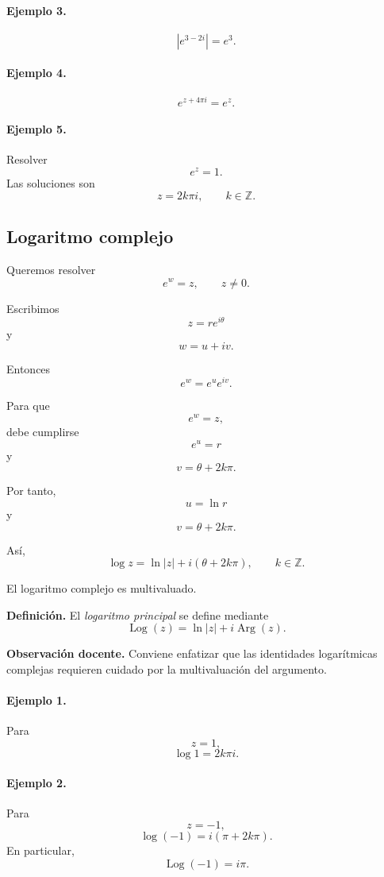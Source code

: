 \paragraph{Ejemplo 3.}
\[
|e^{3-2i}|=e^3.
\]

\paragraph{Ejemplo 4.}
\[
e^{z+4\pi i}=e^z.
\]

\paragraph{Ejemplo 5.}
Resolver
\[
e^z=1.
\]
Las soluciones son
\[
\boxed{z=2k\pi i,\qquad k\in\mathbb{Z}.}
\]

\subsection{Logaritmo complejo}

Queremos resolver
\[
e^w=z,
\qquad
z\neq0.
\]

Escribimos
\[
z=re^{i\theta}
\]
y
\[
w=u+iv.
\]

Entonces
\[
e^w
=
e^u e^{iv}.
\]

Para que
\[
e^w=z,
\]
debe cumplirse
\[
e^u=r
\]
y
\[
v=\theta+2k\pi.
\]

Por tanto,
\[
u=\ln r
\]
y
\[
v=\theta+2k\pi.
\]

Así,
\[
\boxed{
\log z
=
\ln|z|
+
i(\theta+2k\pi),
\qquad
k\in\mathbb{Z}.
}
\]

El logaritmo complejo es multivaluado.

\textbf{Definición.}
El \emph{logaritmo principal} se define mediante
\[
\boxed{
\operatorname{Log}(z)
=
\ln|z|
+
i\operatorname{Arg}(z).
}
\]

\textbf{Observación docente.}
Conviene enfatizar que las identidades logarítmicas complejas requieren
cuidado por la multivaluación del argumento.

\paragraph{Ejemplo 1.}
Para
\[
z=1,
\]
\[
\log 1
=
2k\pi i.
\]

\paragraph{Ejemplo 2.}
Para
\[
z=-1,
\]
\[
\log(-1)
=
i(\pi+2k\pi).
\]
En particular,
\[
\operatorname{Log}(-1)=i\pi.
\]

